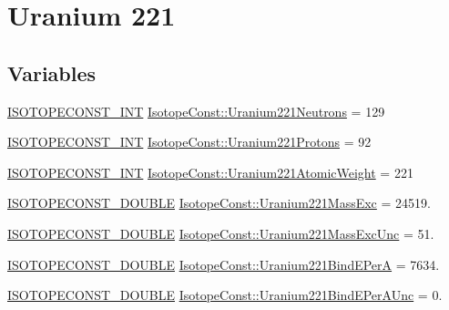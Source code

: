 \hypertarget{group___isotope_const-_uranium-_u221}{}\section{Uranium 221}
\label{group___isotope_const-_uranium-_u221}
\subsection*{Variables}
\begin{DoxyCompactItemize}
\item 
\mbox{\hyperlink{group___isotope_const-_macros_ga5f18360b3e99483a35c32d789e62621c}{I\+S\+O\+T\+O\+P\+E\+C\+O\+N\+S\+T\+\_\+\+I\+NT}} \mbox{\hyperlink{group___isotope_const-_uranium-_u221_ga82e74f3c97650853133a09e4c5b059f5}{Isotope\+Const\+::\+Uranium221\+Neutrons}} = 129
\item 
\mbox{\hyperlink{group___isotope_const-_macros_ga5f18360b3e99483a35c32d789e62621c}{I\+S\+O\+T\+O\+P\+E\+C\+O\+N\+S\+T\+\_\+\+I\+NT}} \mbox{\hyperlink{group___isotope_const-_uranium-_u221_gaaff6fefba5eee0452dadbe75fa95d5cc}{Isotope\+Const\+::\+Uranium221\+Protons}} = 92
\item 
\mbox{\hyperlink{group___isotope_const-_macros_ga5f18360b3e99483a35c32d789e62621c}{I\+S\+O\+T\+O\+P\+E\+C\+O\+N\+S\+T\+\_\+\+I\+NT}} \mbox{\hyperlink{group___isotope_const-_uranium-_u221_gae3e8d312c660594c47bd9492574b9ca2}{Isotope\+Const\+::\+Uranium221\+Atomic\+Weight}} = 221
\item 
\mbox{\hyperlink{group___isotope_const-_macros_ga8f45a7272ce02c0b4c65c44636ed719a}{I\+S\+O\+T\+O\+P\+E\+C\+O\+N\+S\+T\+\_\+\+D\+O\+U\+B\+LE}} \mbox{\hyperlink{group___isotope_const-_uranium-_u221_ga579a3f15c986067ffcfdb82543884685}{Isotope\+Const\+::\+Uranium221\+Mass\+Exc}} = 24519.
\item 
\mbox{\hyperlink{group___isotope_const-_macros_ga8f45a7272ce02c0b4c65c44636ed719a}{I\+S\+O\+T\+O\+P\+E\+C\+O\+N\+S\+T\+\_\+\+D\+O\+U\+B\+LE}} \mbox{\hyperlink{group___isotope_const-_uranium-_u221_gab4d9a02942ced5069e0699dd53ae624f}{Isotope\+Const\+::\+Uranium221\+Mass\+Exc\+Unc}} = 51.
\item 
\mbox{\hyperlink{group___isotope_const-_macros_ga8f45a7272ce02c0b4c65c44636ed719a}{I\+S\+O\+T\+O\+P\+E\+C\+O\+N\+S\+T\+\_\+\+D\+O\+U\+B\+LE}} \mbox{\hyperlink{group___isotope_const-_uranium-_u221_ga559a6e7b2884b3c2e4f8e105757aad18}{Isotope\+Const\+::\+Uranium221\+Bind\+E\+PerA}} = 7634.
\item 
\mbox{\hyperlink{group___isotope_const-_macros_ga8f45a7272ce02c0b4c65c44636ed719a}{I\+S\+O\+T\+O\+P\+E\+C\+O\+N\+S\+T\+\_\+\+D\+O\+U\+B\+LE}} \mbox{\hyperlink{group___isotope_const-_uranium-_u221_ga7473262629a876a9a8acba2c0463f446}{Isotope\+Const\+::\+Uranium221\+Bind\+E\+Per\+A\+Unc}} = 0.

\end{DoxyCompactItemize}
